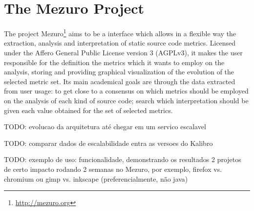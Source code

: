 \newpage
\section{The Mezuro Project}
\label{sec:mezuro}

The project Mezuro\footnote{\url{http://mezuro.org}} aims to be a interface which allows in a flexible way the extraction, analysis and interpretation of static source code metrics. Licensed under the Affero General Public License version 3 (AGPLv3), it makes the user responsible for the definition the metrics which it wants to employ on the analysis, storing and providing graphical visualization of the evolution of the selected metric set. Its main academical goals are through the data extracted from user usage: to get close to a consensus on which metrics should be employed on the analysis of each kind of source code; search which interpretation should be given each value obtained for the set of selected metrics.

TODO: evolucao da arquitetura até chegar em um servico escalavel

TODO: comparar dados de escalabilidade entra as versoes do Kalibro

TODO: exemplo de uso: funcionalidade, demonstrando os resultados 2 projetos de
certo impacto rodando 2 semanas no Mezuro, por exemplo, firefox vs.  chromium
ou gimp vs. inkscape (preferencialmente, não java)






